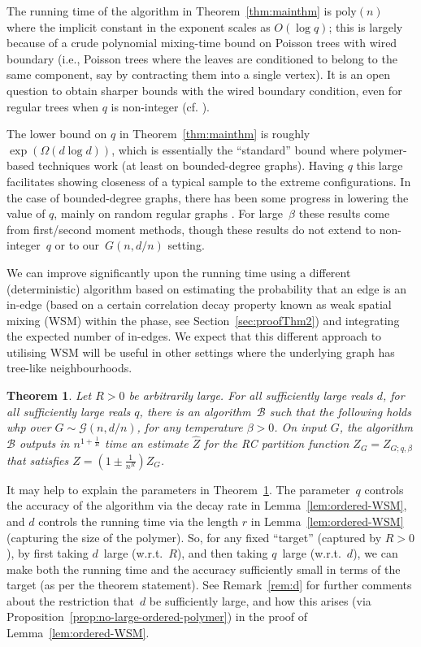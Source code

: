 \documentclass[11pt]{article}
\theoremstyle{plain}
\newtheorem{theorem}{Theorem}
\newcommand{\G}{\mathcal{G}}
\newcommand{\1}{\mathbb{1}}
\begin{document}
The running time of the algorithm in Theorem~\ref{thm:mainthm} is $\text{poly}(n)$ where the implicit constant in the exponent scales as $O(\log q)$; this is largely because of a crude polynomial mixing-time bound on Poisson trees with wired boundary (i.e., Poisson trees where the leaves are conditioned to belong to the same component, say  by contracting them into a single vertex). It is an open question  to obtain sharper bounds with the wired boundary condition, even for regular trees when $q$ is non-integer (cf. \cite[Theorem 5]{SWtrees}).

The lower bound on $q$ in Theorem~\ref{thm:mainthm} is roughly  $\exp(\Omega(d \log d))$, which is essentially the ``standard'' bound where polymer-based techniques work (at least on bounded-degree graphs). Having $q$ this large facilitates showing closeness of a typical sample to the extreme configurations. In the case of bounded-degree graphs,  there has been some progress in lowering the value of $q$, mainly on random regular graphs 
\cite{blanca2021random,galanis2024plantingmcmcsamplingpottsarxiv}. For large~$\beta$ these results come from  first/second moment methods, though these results do not extend to non-integer~$q$ or to our~$G(n,d/n)$ setting.


We can improve significantly upon the running time using a different (deterministic) algorithm based on estimating the probability that an edge is an in-edge (based on a certain correlation decay property known as weak spatial mixing (WSM) within the phase, see Section~\ref{sec:proofThm2}) and integrating the expected number of in-edges. We expect that this different approach to utilising WSM will be useful in other settings where the underlying graph has tree-like neighbourhoods.
\begin{theorem}\label{thm:mainthm2}
    Let $R>0$ be arbitrarily large. For all sufficiently large reals $d$,   for all sufficiently large reals \(q\), there is an algorithm~$\mathcal{B}$ such that the following holds whp over \(G\sim\G(n,d/n)\), for any temperature $\beta>0$.
    On input $G$, the algorithm $\mathcal{B}$ outputs in $n^{1+\frac{1}{R}}$ time an estimate $\hat Z$ for the RC partition function $Z_G=Z_{G;q,\beta}$  that satisfies $\hat Z=(1\pm \tfrac{1}{n^{R}})Z_G$. 
\end{theorem}

It may help to explain the parameters in Theorem~\ref{thm:mainthm2}. The parameter~$q$
controls the accuracy of the algorithm via the decay rate in Lemma~\ref{lem:ordered-WSM}, and $d$ controls the running time via the length $r$ in Lemma~\ref{lem:ordered-WSM} (capturing the size of the polymer).  So, for any fixed ``target'' (captured by $R>0$), by first taking $d$~large (w.r.t.~$R$), and then taking $q$~large (w.r.t.~$d$), we can make both the running time and the accuracy sufficiently small in terms of the target (as per the theorem statement). See Remark~\ref{rem:d} for further comments about the restriction that~$d$ be sufficiently large, and how this arises (via Proposition~\ref{prop:no-large-ordered-polymer}) in the proof of Lemma~\ref{lem:ordered-WSM}.
\end{document}
